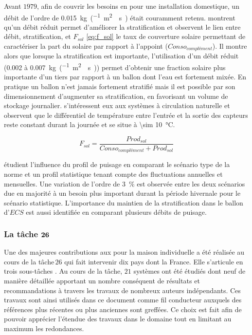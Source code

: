 Avant $1979$, afin de couvrir les besoins en  pour une installation domestique,
un débit de l’ordre de \SI{0.015}{kg\per(\metre\squared\period\second)}
était couramment retenu. \textcite{Koppen1979} montrent qu’un débit réduit
permet d’améliorer la stratification et \textcite{Wuestling1985}
observent le lien entre débit, stratification, et $F_{sol}$ \eqref{eq:f_sol} le taux de couverture
solaire permettant de caractériser la part du solaire par rapport à l’appoint ($Conso_{complément}$).
Il montre alors que lorsque la stratification est importante,
l’utilisation d’un débit réduit (\num{0.002} à \SI{0.007}{kg\per(\metre\squared\period\second)}) permet
d’obtenir une fraction solaire plus importante d’un tiers par rapport à un ballon dont
l’eau est fortement mixée. En pratique un ballon n’est jamais fortement stratifié mais il est possible par son dimensionnement
d’augmenter sa stratification, en favorisant un volume de stockage journalier. \textcite{Loef1967}
s’intéressent eux aux systèmes à circulation naturelle et observent que le différentiel
de température entre l’entrée et la sortie des capteurs reste constant durant la journée
et se situe à \SI{\sim 10}{\celsius}.

\begin{equation}\label{eq:f_sol}
    F_{sol} = \frac{Prod_{sol}}{Conso_{complément} + Prod_{sol}}
\end{equation}

\textcite{Jordan2001197} étudient l’influence du profil de puisage en comparant le
scénario type de la norme  et un profil statistique tenant compte
des fluctuations annuelles et mensuelles. Une variation de l’ordre
de \SI{3}{\percent} est observée entre les deux scénarios due en majorité à un besoin plus
important durant la période hivernale pour le scénario statistique.
L’importance du maintien de la stratification dans le ballon d’$ECS$ est aussi identifiée
en comparant plusieurs débits de puisage.


\subsubsection{La tâche $\bf{26}$} %
\label{ssub:la_tâche_26}
Une des majeures contributions aux  pour la maison individuelle a été réalisée au cours
de la tâche\,$26$ qui fait intervenir dix pays dont la France. Elle s’articule en
trois sous-tâches \parencite{Task26C2003}. Au cours
de la tâche, $21$ systèmes ont été étudiés dont neuf de manière détaillée apportant
un nombre conséquent de résultats et recommandations à travers les travaux de nombreux
auteurs indépendants.
Ces travaux sont ainsi utilisés dans ce document comme fil conducteur auxquels des
références plus récentes ou plus anciennes sont greffées. Ce choix est fait afin
de pouvoir apprécier l’étendue des travaux dans le domaine tout en limitant au
maximum les redondances.

